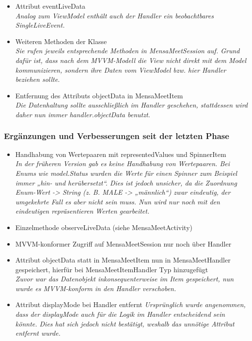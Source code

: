\documentclass[a4paper]{scrreprt}
\begin{document}
\begin{itemize}
\item Attribut eventLiveData\\
\textit{Analog zum ViewModel enthält auch der Handler ein beobachtbares SingleLiveEvent.}
\item Weiteren Methoden der Klasse\\
\textit{Sie rufen jeweils entsprechende Methoden in MensaMeetSession auf. Grund dafür ist, dass nach dem MVVM-Modell die View nicht direkt mit dem Model kommunizieren, sondern ihre Daten vom ViewModel bzw. hier Handler beziehen sollte. }
\item Entfernung des Attributs objectData in MensaMeetItem \\
\textit{Die Datenhaltung sollte ausschließlich im Handler geschehen, stattdessen wird daher nun immer handler.objectData benutzt.}

\end{itemize}

\subsubsection{Ergänzungen und Verbesserungen seit der letzten Phase}
\begin{itemize}
\item Handhabung von Wertepaaren mit representedValues und SpinnerItem \\
\textit{In der früheren Version gab es keine Handhabung von Wertepaaren. Bei Enums wie model.Status wurden die Werte für einen Spinner zum Beispiel immer „hin- und herübersetzt“. Dies ist jedoch unsicher, da die Zuordnung Enum-Wert -> String (z. B. MALE -> „männlich“) zwar eindeutig, der umgekehrte Fall es aber nicht sein muss. Nun wird nur noch mit den eindeutigen repräsentieren Werten gearbeitet.}
\item Einzelmethode observeLiveData (siehe MensaMeetActivity)
\item MVVM-konformer Zugriff auf MensaMeetSession nur noch über Handler
\item Attribut objectData statt in MensaMeetItem nun in MensaMeetHandler gespeichert, hierfür bei MensaMeetItemHandler Typ hinzugefügt\\
\textit{Zuvor war das Datenobjekt inkonsequenterweise im Item gespeichert, nun wurde es MVVM-konform in den Handler verschoben.}
\item Attribut displayMode bei Handler entfernt
\textit{Ursprünglich wurde angenommen, dass der displayMode auch für die Logik im Handler entscheidend sein könnte. Dies hat sich jedoch nicht bestätigt, weshalb das  unnötige Attribut entfernt wurde.}

\end{itemize}
\end{document}
